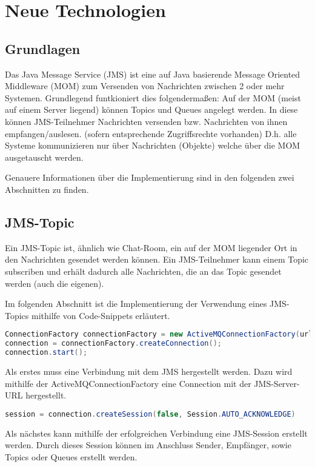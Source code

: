 \documentclass[11pt, a4paper]{article}
\begin{document}
\section{Neue Technologien}
\subsection{Grundlagen}
Das Java Message Service (JMS) ist eine auf Java basierende Message Oriented Middleware (MOM) zum Versenden von Nachrichten zwischen 2 oder mehr Systemen.
Grundlegend funtkioniert dies folgendermaßen:
Auf der MOM (meist auf einem Server liegend) können Topics und Queues angelegt werden.
In diese können JMS-Teilnehmer Nachrichten versenden bzw. Nachrichten von ihnen empfangen/auslesen. (sofern entsprechende Zugriffsrechte vorhanden)
D.h. alle Systeme kommunizieren nur über Nachrichten (Objekte) welche über die MOM ausgetauscht werden.

Genauere Informationen über die Implementierung sind in den folgenden zwei Abschnitten zu finden.

\subsection{JMS-Topic}
Ein JMS-Topic ist, ähnlich wie Chat-Room, ein auf der MOM liegender Ort in den Nachrichten gesendet werden können. Ein JMS-Teilnehmer kann einem Topic
subscriben und erhält dadurch alle Nachrichten, die an das Topic gesendet werden (auch die eigenen).

Im folgenden Abschnitt ist die Implementierung der Verwendung eines JMS-Topics mithilfe von Code-Snippets erläutert.

\begin{lstlisting}[language=Java]
ConnectionFactory connectionFactory = new ActiveMQConnectionFactory(url);
connection = connectionFactory.createConnection();
connection.start();
\end{lstlisting}

Als erstes muss eine Verbindung mit dem JMS hergestellt werden. Dazu wird mithilfe der ActiveMQConnectionFactory eine Connection mit der JMS-Server-URL
hergestellt.

\begin{lstlisting}[language=Java]
session = connection.createSession(false, Session.AUTO_ACKNOWLEDGE)
\end{lstlisting}

Als nächstes kann mithilfe der erfolgreichen Verbindung eine JMS-Session erstellt werden. Durch dieses Session können im Anschluss Sender, Empfänger, sowie
Topics oder Queues erstellt werden.
\end{document}
